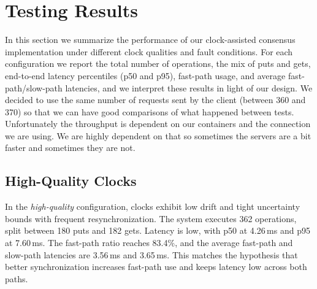 \documentclass{article}
\begin{document}
\section{Testing Results}
In this section we summarize the performance of our clock-assisted consensus implementation under different clock qualities and fault conditions. For each configuration we report the total number of operations, the mix of puts and gets, end-to-end latency percentiles (p50 and p95), fast-path usage, and average fast-path/slow-path latencies, and we interpret these results in light of our design.
We decided to use the same number of requests sent by the client (between 360 and 370) so that we can have good comparisons of what happened between tests.
Unfortunately the throughput is dependent on our containers and the connection we are using. We are highly dependent on that so sometimes the servers are a bit faster and sometimes they are not.
\begin{table}[h]
  \centering
  \small
  \caption{Summary of benchmark results across all configurations. Latencies are in milliseconds.}
\end{table}

\subsection{High-Quality Clocks}
In the \emph{high-quality} configuration, clocks exhibit low drift and tight uncertainty bounds with frequent resynchronization. The system executes 362 operations, split between 180 puts and 182 gets. Latency is low, with p50 at 4.26\,ms and p95 at 7.60\,ms. The fast-path ratio reaches 83.4\%, and the average fast-path and slow-path latencies are 3.56\,ms and 3.65\,ms. This matches the hypothesis that better synchronization increases fast-path use and keeps latency low across both paths.
\end{document}
